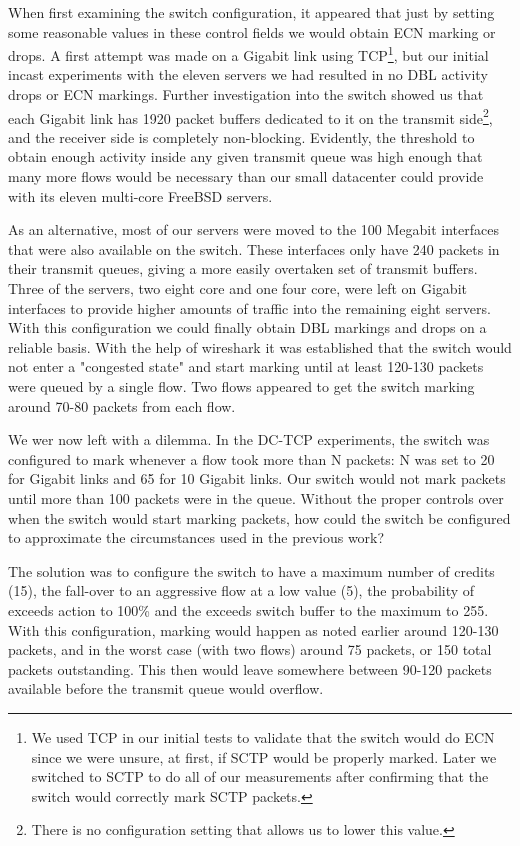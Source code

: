 \documentclass[12pt]{article}
\begin{document}
 When first examining the switch configuration, it appeared that just by setting some reasonable values in these
 control fields we would obtain ECN marking or drops. A first attempt was made on a Gigabit
 link using TCP\footnote{We used TCP in our initial tests to validate that the switch would do ECN since
 we were unsure, at first, if SCTP would be properly marked. Later we switched to SCTP to do all of our measurements
 after confirming that the switch would correctly mark SCTP packets.},
 but our initial incast experiments with the eleven servers we had resulted in no DBL  
 activity drops or ECN markings. Further investigation into the switch showed us that each Gigabit link has 1920 packet
 buffers dedicated to it on the transmit side\footnote{There is no configuration setting that allows us
 to lower this value.}, and the receiver side is completely non-blocking. Evidently, the
 threshold to obtain enough activity inside any given transmit queue was high enough that many more
 flows would be necessary than our small datacenter could provide with its eleven multi-core FreeBSD servers. 
 
 As an alternative, most of our servers were moved to the 100 Megabit interfaces that were also available
 on the switch. These interfaces only have 240 packets in their transmit queues, giving a more easily
 overtaken set of transmit buffers. Three of the servers,
 two eight core and one four core, were left on Gigabit interfaces to provide higher amounts of traffic
 into the remaining eight servers. With this configuration we could finally obtain DBL markings and drops
 on a reliable basis. With the help of wireshark\cite{} it was established that the switch would not
 enter a "congested state" and start marking until at least 120-130 packets were queued by a single
 flow. Two flows appeared to get the switch marking around 70-80 packets from each flow.
 
We wer now left with a dilemma. In the DC-TCP experiments, the switch was configured to mark
 whenever a flow took more than N packets:  N was set to 20 for Gigabit links and 65 for
 10 Gigabit links. Our switch would not mark packets until more than
 100 packets were in the queue. Without the proper controls over when the switch would start marking packets,  how could the switch 
 be configured to approximate the circumstances used in the previous work?
 
 The solution was to configure the switch to have a maximum number
 of credits (15), the fall-over to an aggressive flow at a low value (5), the probability
 of exceeds action to 100\% and the exceeds switch buffer to the maximum to 255. With
 this configuration, marking would happen as noted earlier around 120-130 packets, and
 in the worst case (with two flows) around 75 packets, or 150 total packets outstanding. This then
 would leave somewhere between 90-120 packets available before the transmit queue would overflow.
 
\end{document}
